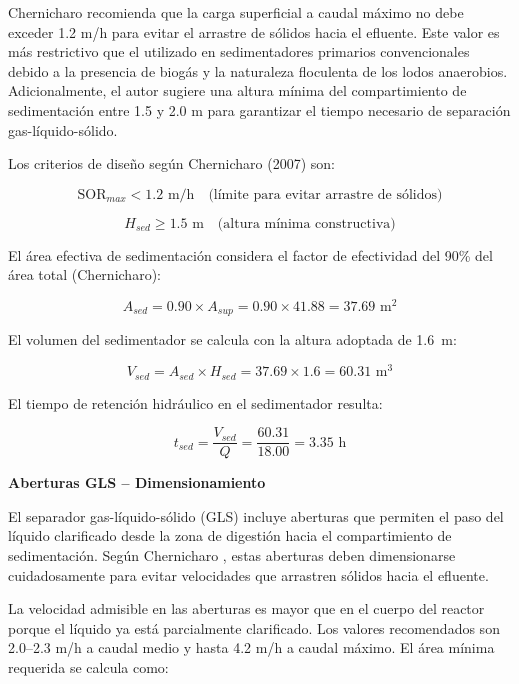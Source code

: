 \documentclass[12pt,a4paper]{article}
\begin{document}
Chernicharo recomienda que la carga superficial a caudal máximo no debe exceder 1.2 m/h para evitar el arrastre de sólidos hacia el efluente. Este valor es más restrictivo que el utilizado en sedimentadores primarios convencionales debido a la presencia de biogás y la naturaleza floculenta de los lodos anaerobios. Adicionalmente, el autor sugiere una altura mínima del compartimiento de sedimentación entre 1.5 y 2.0 m para garantizar el tiempo necesario de separación gas-líquido-sólido.

Los criterios de diseño según Chernicharo (2007) son:

\begin{equation}
\text{SOR}_{max} < 1.2 \text{ m/h} \quad \text{(límite para evitar arrastre de sólidos)}
\end{equation}

\begin{equation}
H_{sed} \geq 1.5 \text{ m} \quad \text{(altura mínima constructiva)}
\end{equation}

El área efectiva de sedimentación considera el factor de efectividad del 90\% del área total (Chernicharo):

\begin{equation}
A_{sed} = 0.90 \times A_{sup} = 0.90 \times 41.88 = 37.69 \text{ m}^2
\end{equation}

El volumen del sedimentador se calcula con la altura adoptada de 1.6~m:

\begin{equation}
V_{sed} = A_{sed} \times H_{sed} = 37.69 \times 1.6 = 60.31 \text{ m}^3
\end{equation}

El tiempo de retención hidráulico en el sedimentador resulta:

\begin{equation}
t_{sed} = \frac{V_{sed}}{Q} = \frac{60.31}{18.00} = 3.35 \text{ h}
\end{equation}

\textbf{Aberturas GLS -- Dimensionamiento}

El separador gas-líquido-sólido (GLS) incluye aberturas que permiten el paso del líquido clarificado desde la zona de digestión hacia el compartimiento de sedimentación. Según Chernicharo \cite{chernicharo2007}, estas aberturas deben dimensionarse cuidadosamente para evitar velocidades que arrastren sólidos hacia el efluente.

La velocidad admisible en las aberturas es mayor que en el cuerpo del reactor porque el líquido ya está parcialmente clarificado. Los valores recomendados son 2.0--2.3 m/h a caudal medio y hasta 4.2 m/h a caudal máximo. El área mínima requerida se calcula como:
\end{document}
